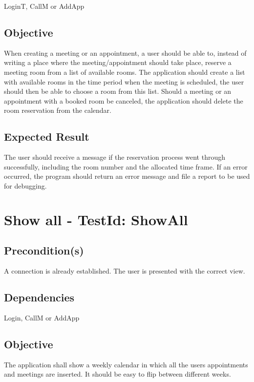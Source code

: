 \documentclass{article}
\begin{document}
LoginT, CallM or AddApp

\subsection{Objective}

When creating a meeting or an appointment, a user should be able to, instead
of writing a place where the meeting/appointment should take place, reserve
a meeting room from a list of available rooms. The application should create
a list with available rooms in the time period when the meeting is
scheduled, the user should then be able to choose a room from this list.
Should a meeting or an appointment with a booked room be canceled, the
application should delete the room reservation from the calendar.

\subsection{Expected Result}

The user should receive a message if the reservation process went through
successfully, including the room number and the allocated time frame. If an
error occurred, the program should return an error message and file a report
to be used for debugging. \newpage

\section{Show all - TestId: ShowAll}

\subsection{Precondition(s)}

A connection is already established. The user is presented with the correct
view.

\subsection{Dependencies}

Login, CallM or AddApp

\subsection{Objective}

The application shall show a weekly calendar in which all the users
appointments and meetings are inserted. It should be easy to flip between
different weeks.
\end{document}
